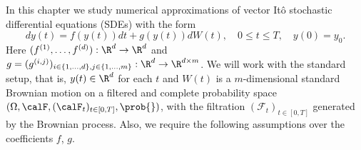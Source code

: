 	In this chapter we  study numerical approximations of vector It\^o stochastic differential equations (SDEs) with 
the form
\begin{equation}\label{eqn:SDE1}
	dy(t)
	=f(y(t))dt + g(y(t))dW(t), \quad 0\leq t\leq T,
	\quad y(0)=y_0.
\end{equation}
Here $(f^{(1)},\dots, f^{(d)}):\R^d \to \R^d$ and 
$g = (g^{(i,j)})_{i\in \{1,\dots,d\}, j\in\{1,\dots, m\}}:\R^d \to \R^{d\times m}$.
We will work with the standard setup, that is,  $y(t)\in \R^d$ for each $t$ and  $W(t)$ is a
$m$-dimensional standard Brownian motion on a filtered and complete probability space
$
	(
		\Omega ,\calF,(\calF_t)_{t\in[0,T]},\prob{}
	)
$,
with the filtration
$(\mathcal{F}_t)_{t\in[0,T]}$  generated by the Brownian process.
%
Also, we require the following assumptions over the coefficients 
	$f %
	$,
	$
		g %
	$.
%
